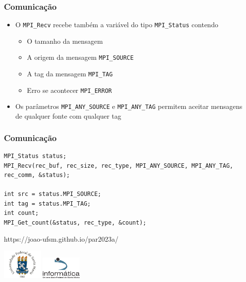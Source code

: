 \documentclass[xcolor={usenames,dvipsnames},12pt,presentation,aspectratio=169]{beamer}
\begin{document}
\begin{frame}[fragile]
  \frametitle{Comunicação}
\begin{itemize}
  \item O \texttt{MPI_Recv} recebe também a variável do tipo \texttt{MPI_Status} contendo
  \begin{itemize}
    \item O tamanho da mensagem 
    \item A origem da mensagem \texttt{MPI_SOURCE}
    \item A tag da mensagem \texttt{MPI_TAG}
    \item Erro se acontecer \texttt{MPI_ERROR}
  \end{itemize}
  \item Os parâmetros \texttt{MPI_ANY_SOURCE} e \texttt{MPI_ANY_TAG} permitem aceitar mensagens de qualquer fonte com qualquer tag
\end{itemize}
%
\end{frame}
\begin{frame}[fragile]
  \frametitle{Comunicação}
\begin{center}
  \begin{minipage}{0.95\textwidth}
    \begin{verbatim}
MPI_Status status;
MPI_Recv(rec_buf, rec_size, rec_type, MPI_ANY_SOURCE, MPI_ANY_TAG, rec_comm, &status);

int src = status.MPI_SOURCE;
int tag = status.MPI_TAG;
int count;
MPI_Get_count(&status, rec_type, &count);
        \end{verbatim}
  \end{minipage}
  \end{center}
  
\end{frame}
\begin{frame}[plain]{}
  \begin{center}
    \vspace{2cm}
    \Large{https://joao-ufsm.github.io/par2023a/}
    
    \vspace{1cm}
    \includegraphics[width=2cm]{logo_ufsm}
    \hspace{0.5cm}
    \includegraphics[width=2cm]{logo_inf}
  \end{center}
\end{frame}
\end{document}
